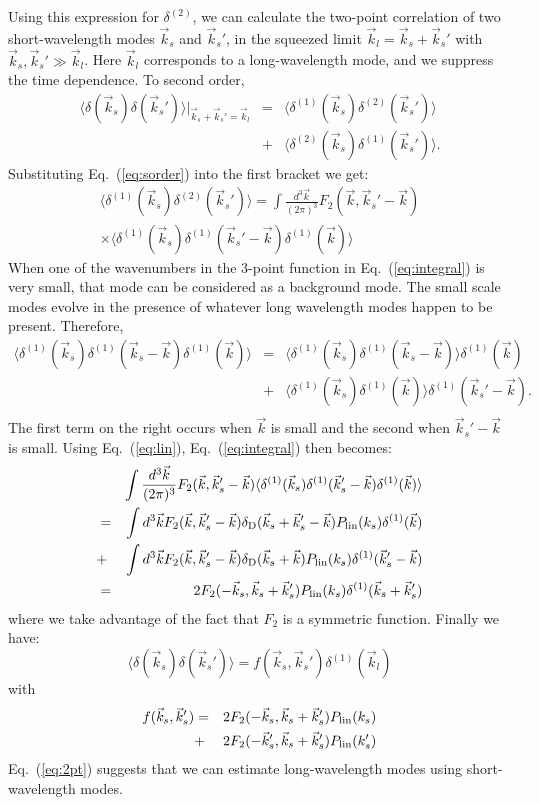 \documentclass[prd,amsmath,amssymb,floatfix,superscriptaddress,nofootinbib,twocolumn]{revtex4-1}
\def\be{\begin{equation}}
\def\ee{\end{equation}}
\def\bea{\begin{eqnarray}}
\def\eea{\end{eqnarray}}
\newcommand{\vs}{\nonumber\\}
\newcommand{\vk}{\vec{k}}
\newcommand{\ec}[1]{Eq.~(\ref{eq:#1})}
\newcommand{\eql}[1]{\label{eq:#1}}
\begin{document}
Using this expression for $\delta^{(2)}$, we can calculate the two-point correlation of two short-wavelength modes $\vk_s$ and $\vk_s'$, in the squeezed limit $\vk_l=\vk_s+\vk_s'$ with $\vk_s,\vk_s' \gg \vk_l$. Here $\vk_l$ corresponds to a long-wavelength mode, and we suppress the time dependence. To second order,
\bea 
 \langle {\delta}(\vec{k}_s){\delta}(\vec{k}_s') \rangle|_{\vk_s+\vk_s'=\vk_l}&=&
  \langle {\delta}^{(1)}(\vec{k}_s){\delta}^{(2)}(\vec{k}_s') \rangle\vs
  &+&\langle {\delta}^{(2)}(\vec{k}_s){\delta}^{(1)}(\vec{k}_s') \rangle.
\eea 
Substituting \ec{sorder} into the first bracket we get:
\bea 
\langle {\delta}^{(1)}(\vec{k}_s){\delta}^{(2)}(\vec{k}_s') \rangle =  \int \frac{d^3\vec{k}}{(2\pi)^3} F_2 (\vec{k},\vec{k}_s'-\vec{k})\vs
\times \langle {\delta}^{(1)}(\vec{k}_s){\delta}^{(1)}(\vec{k}_s'-\vec{k}){\delta}^{(1)}(\vec{k}) \rangle \eql{integral}
\eea 
When one of the wavenumbers in the 3-point function in \ec{integral} is very small, that mode can be considered as a background mode. The small scale modes evolve in the presence of whatever long wavelength modes happen to be present. Therefore, 
\bea
\langle
\delta^{(1)}(\vk_{s}) \delta^{(1)}(\vk_{s}-\vk){\delta^{(1)}}(\vk) 
\rangle
&=&\langle {\delta^{(1)}}(\vk_{s}) {\delta^{(1)}}(\vk_{s}-\vk) \rangle {\delta^{(1)}}(\vk)  \vs
&+&\langle {\delta^{(1)}}(\vk_{s}) {\delta^{(1)}}(\vk) \rangle {\delta^{(1)}}(\vk_s'-\vk) .
\vs
\eql{contraction}
\eea
The first term on the right occurs when $\vk$ is small and the second when $\vk_s'-\vk$ is small.
Using \ec{lin}, \ec{integral} then becomes:
\bea 
&&\int \frac{d^3\vec{k}}{(2\pi)^3} F_2 (\vec{k},\vec{k}_s'-\vec{k})\langle {\delta}^{(1)}(\vec{k}_s){\delta}^{(1)}(\vec{k}_s'-\vec{k}){\delta}^{(1)}(\vec{k}) \rangle \vs
&=&\int d^3\vk F_2(\vec{k},\vec{k}_s'-\vec{k}) \delta_{\rm D}(\vk_s+\vk_s'-\vk)P_{\rm lin}(k_s){\delta}^{(1)}(\vec{k}) \vs
&+&\int d^3\vk F_2(\vec{k},\vec{k}_s'-\vec{k}) \delta_{\rm D}(\vk_s+\vk)P_{\rm lin}(k_s){\delta}^{(1)}(\vk_s'-\vk) \vs
&=&2F_2(-\vk_s,\vk_s+\vk_s')P_{\rm lin}(k_s){\delta}^{(1)}(\vk_s+\vk_s')
\eea 
where we take advantage of the fact that $F_2$ is a symmetric function. Finally we have:
\be 
\langle {\delta}(\vec{k}_s){\delta}(\vec{k}_s') \rangle =f(\vec{k}_s,\vec{k}_s'){\delta}^{(1)}(\vec{k}_l) \eql{2pt}
\ee 
with
\bea
f(\vec{k}_s,\vec{k}_s')&=&2F_2(-\vec{k}_s,\vec{k}_s+\vec{k}_s')P_{\rm lin}(k_s)\vs
&+&2F_2(-\vec{k}_s',\vec{k}_s+\vec{k}_s')P_{\rm lin}(k_s')       
\eea 
\ec{2pt} suggests that we can estimate long-wavelength modes using short-wavelength modes.\\
\end{document}
